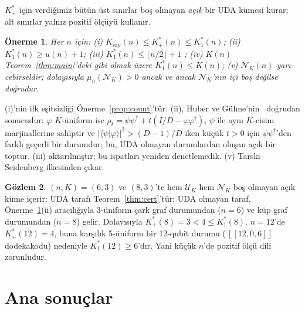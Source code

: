 \documentclass[aps,pra,onecolumn,superscriptaddress,nofootinbib,longbibliography,10pt]{revtex4-2}
\newtheorem{proposition}{Önerme}[section]
\theoremstyle{definition}
\newtheorem{observation}[proposition]{Gözlem}
\newcommand{\Kp}{K^{*}_{+}}
\newcommand{\Ko}{K^{*}_{1}}
\newcommand{\Kc}{K_{\mathrm{say}}}
\begin{document}
$\Kp$ için verdiğimiz bütün üst sınırlar boş olmayan \emph{açık} bir UDA kümesi kurar; alt sınırlar yalnız pozitif ölçüyü kullanır.

\begin{proposition}\label{prop:rel}
Her $n$ için:
(i) $\Kc(n)\le\Kp(n)\le\Ko(n)$;
(ii) $\Ko(n)\ge u(n)+1$;
(iii) $\Ko(n)\le\lfloor n/2\rfloor+1$ \cite{JL05,HCLZ18};
(iv) $K(n)$ Teorem~\ref{thm:main}'deki gibi olmak üzere $\Ko(n)\le K(n)$;
(v) $\mathcal N_K(n)$ yarı-cebirseldir; dolayısıyla $\mu_n(\mathcal N_K)>0$ ancak ve ancak $\mathcal N_K$'nın içi boş değilse doğrudur.
\end{proposition}
\noindent (i)'nin ilk eşitsizliği Önerme~\ref{prop:count}'tür. (ii), Huber ve Gühne'nin~\cite{HG16} doğrudan sonucudur: $\varphi$ $K$-üniform ise $\rho_t=\psi\psi^\dagger+t(I/D-\varphi\varphi^\dagger)$, $\psi$ ile aynı $K$-cisim marjinallerine sahiptir ve $|\langle\psi|\varphi\rangle|^2>(D-1)/D$ iken küçük $t>0$ için $\psi\psi^\dagger$'den farklı geçerli bir durumdur; bu, UDA olmayan durumlardan oluşan açık bir toptur. (iii) aktarılmıştır; bu ispatları yeniden denetlemedik. (v) Tarski--Seidenberg ilkesinden çıkar.

\begin{observation}\label{obs:sep}
$(n, K)=(6, 3)$ ve $(8, 3)$'te hem $\mathcal U_K$ hem $\mathcal N_K$ boş olmayan açık küme içerir: UDA tarafı Teorem~\ref{thm:cert}'tür; UDA olmayan taraf, Önerme~\ref{prop:rel}(ii) aracılığıyla 3-üniform çark graf durumundan ($n=6$) ve küp graf durumundan ($n=8$) gelir. Dolayısıyla $\Kp(8)=3<4\le\Ko(8)$. $n=12$'de $\Kp(12)=4$, buna karşılık 5-üniform bir 12-qubit durumu (\,$[[12{,}0{,}6]]$ dodekakodu) nedeniyle $\Ko(12)\ge6$'dır. Yani küçük $n$'de pozitif ölçü dili zorunludur.
\end{observation}

\section{Ana sonuçlar}
\end{document}
